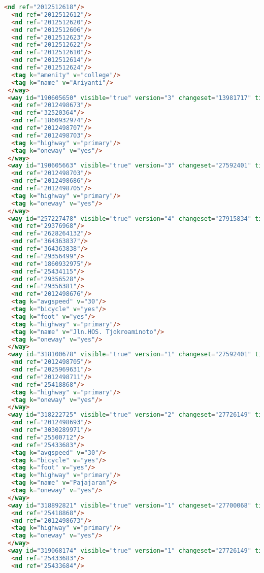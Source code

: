 \begin{lstlisting}[language=HTML,basicstyle=\tiny,caption=bandung1.xml]
  <nd ref="2012512618"/>
  <nd ref="2012512612"/>
  <nd ref="2012512620"/>
  <nd ref="2012512606"/>
  <nd ref="2012512623"/>
  <nd ref="2012512622"/>
  <nd ref="2012512610"/>
  <nd ref="2012512614"/>
  <nd ref="2012512624"/>
  <tag k="amenity" v="college"/>
  <tag k="name" v="Ariyanti"/>
 </way>
 <way id="190605650" visible="true" version="3" changeset="13981717" timestamp="2012-11-22T06:24:04Z" user="yudiwbs" uid="268765">
  <nd ref="2012498673"/>
  <nd ref="32520364"/>
  <nd ref="1860932974"/>
  <nd ref="2012498707"/>
  <nd ref="2012498703"/>
  <tag k="highway" v="primary"/>
  <tag k="oneway" v="yes"/>
 </way>
 <way id="190605663" visible="true" version="3" changeset="27592401" timestamp="2014-12-20T16:49:58Z" user="gnocin" uid="2526082">
  <nd ref="2012498703"/>
  <nd ref="2012498686"/>
  <nd ref="2012498705"/>
  <tag k="highway" v="primary"/>
  <tag k="oneway" v="yes"/>
 </way>
 <way id="257227478" visible="true" version="4" changeset="27915834" timestamp="2015-01-04T17:55:47Z" user="isonpurba" uid="2552445">
  <nd ref="29376968"/>
  <nd ref="2628264132"/>
  <nd ref="364363837"/>
  <nd ref="364363838"/>
  <nd ref="29356499"/>
  <nd ref="1860932975"/>
  <nd ref="25434115"/>
  <nd ref="29356528"/>
  <nd ref="29356381"/>
  <nd ref="2012498676"/>
  <tag k="avgspeed" v="30"/>
  <tag k="bicycle" v="yes"/>
  <tag k="foot" v="yes"/>
  <tag k="highway" v="primary"/>
  <tag k="name" v="Jln.HOS. Tjokroaminoto"/>
  <tag k="oneway" v="yes"/>
 </way>
 <way id="318100678" visible="true" version="1" changeset="27592401" timestamp="2014-12-20T16:49:54Z" user="gnocin" uid="2526082">
  <nd ref="2012498705"/>
  <nd ref="2025969631"/>
  <nd ref="2012498711"/>
  <nd ref="25418868"/>
  <tag k="highway" v="primary"/>
  <tag k="oneway" v="yes"/>
 </way>
 <way id="318222725" visible="true" version="2" changeset="27726149" timestamp="2014-12-27T09:47:32Z" user="gnocin" uid="2526082">
  <nd ref="2012498693"/>
  <nd ref="3030289971"/>
  <nd ref="25500712"/>
  <nd ref="25433683"/>
  <tag k="avgspeed" v="30"/>
  <tag k="bicycle" v="yes"/>
  <tag k="foot" v="yes"/>
  <tag k="highway" v="primary"/>
  <tag k="name" v="Pajajaran"/>
  <tag k="oneway" v="yes"/>
 </way>
 <way id="318892821" visible="true" version="1" changeset="27700068" timestamp="2014-12-26T00:34:22Z" user="gnocin" uid="2526082">
  <nd ref="25418868"/>
  <nd ref="2012498673"/>
  <tag k="highway" v="primary"/>
  <tag k="oneway" v="yes"/>
 </way>
 <way id="319068174" visible="true" version="1" changeset="27726149" timestamp="2014-12-27T09:47:29Z" user="gnocin" uid="2526082">
  <nd ref="25433683"/>
  <nd ref="25433684"/>

\end{lstlisting}
